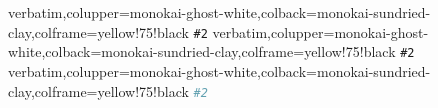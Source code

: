  {verbatim,colupper=monokai-ghost-white,colback=monokai-sundried-clay,colframe=yellow!75!black} {%
\lstinline[language=command.com,keywordstyle=\color{blue!35!white}\bfseries]^#2^}
 {verbatim,colupper=monokai-ghost-white,colback=monokai-sundried-clay,colframe=yellow!75!black} {%
\lstinline[language=command.com,keywordstyle=\color{blue!35!white}\bfseries]^#2^}    
 {verbatim,colupper=monokai-ghost-white,colback=monokai-sundried-clay,colframe=yellow!75!black} {%
\lstinline[language=python,keywordstyle=\color{blue!35!white}\bfseries]^#2^}    
